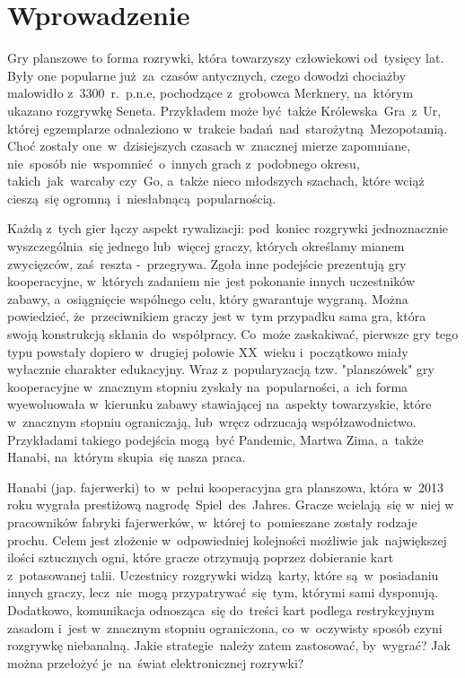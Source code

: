 \documentclass[declaration,shortabstract,inz]{iithesis}
\author         {Wojciech Jarząbek \and
				Jacek Leja}
\begin{document}

\chapter{Wprowadzenie}

Gry planszowe to forma rozrywki, która towarzyszy człowiekowi od~tysięcy lat. Były one popularne już za~czasów antycznych, czego dowodzi chociażby malowidło z~3300~r.~p.n.e, pochodzące z~grobowca Merknery, na~którym ukazano rozgrywkę Seneta. Przykładem może być także Królewska~Gra~z~Ur, której egzemplarze odnaleziono w~trakcie badań nad~starożytną Mezopotamią. Choć zostały one~w~dzisiejszych czasach w~znacznej mierze zapomniane, nie~sposób nie~wspomnieć o~innych grach z~podobnego okresu, takich~jak~warcaby czy~Go, a~także nieco młodszych szachach, które wciąż cieszą~się ogromną i~niesłabnącą popularnością.

Każdą z~tych gier łączy aspekt rywalizacji: pod~koniec rozgrywki jednoznacznie wyszczególnia~się jednego lub~więcej graczy, których określamy mianem zwycięzców, zaś~reszta -~przegrywa. Zgoła inne podejście prezentują gry kooperacyjne, w~których zadaniem nie~jest pokonanie innych uczestników zabawy, a~osiągnięcie wspólnego celu, który gwarantuje wygraną. Można powiedzieć, że~przeciwnikiem graczy jest w~tym przypadku sama gra, która swoją konstrukcją skłania do~współpracy. Co~może zaskakiwać, pierwsze gry tego typu powstały dopiero w~drugiej połowie XX~wieku i~początkowo miały wyłacznie charakter edukacyjny. Wraz z~popularyzacją tzw. "planszówek" gry kooperacyjne w~znacznym stopniu zyskały na~popularności, a~ich forma wyewoluowała w~kierunku zabawy stawiającej na~aspekty towarzyskie, które w~znacznym stopniu ograniczają, lub~wręcz odrzucają współzawodnictwo. Przykładami takiego podejścia mogą~być Pandemic, Martwa Zima, a~także Hanabi, na~którym skupia~się nasza praca.

Hanabi (jap. fajerwerki) to~w~pełni kooperacyjna gra planszowa, która w~2013 roku wygrała prestiżową nagrodę Spiel~des~Jahres. Gracze wcielają~się w~niej w pracowników fabryki fajerwerków, w~której to~pomieszane zostały rodzaje prochu. Celem jest złożenie w~odpowiedniej kolejności możliwie jak~największej ilości sztucznych ogni, które gracze otrzymują poprzez dobieranie kart z~potasowanej talii. Uczestnicy rozgrywki widzą karty, które są~w~posiadaniu innych graczy, lecz~nie~mogą przypatrywać~się~tym, którymi sami dysponują. Dodatkowo, komunikacja odnosząca~się do~treści kart podlega restrykcyjnym zasadom i~jest w~znacznym stopniu ograniczona, co~w~oczywisty sposób czyni rozgrywkę niebanalną. Jakie strategie należy zatem zastosować, by~wygrać? Jak można przełożyć je~na~świat elektronicznej rozrywki?
\end{document}
